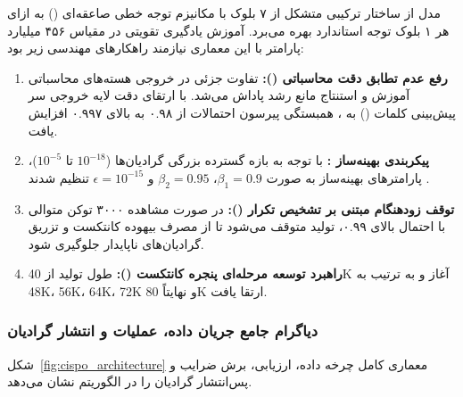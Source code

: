 مدل  از ساختار ترکیبی متشکل از ۷ بلوک  با مکانیزم توجه خطی صاعقه‌ای () \cite{qin2024lightning2} به ازای هر ۱ بلوک توجه استاندارد  بهره می‌برد. آموزش یادگیری تقویتی در مقیاس ۴۵۶ میلیارد پارامتر با این معماری نیازمند راهکارهای مهندسی زیر بود:
\begin{enumerate}
    \item \textbf{رفع عدم تطابق دقت محاسباتی ():} تفاوت جزئی در خروجی هسته‌های محاسباتی آموزش و استنتاج مانع رشد پاداش می‌شد. با ارتقای دقت لایه خروجی سر پیش‌بینی کلمات () به ، همبستگی پیرسون احتمالات از ۰.۹۸ به بالای ۰.۹۹۷ افزایش یافت.
    \item \textbf{پیکربندی بهینه‌ساز :} با توجه به بازه گسترده بزرگی گرادیان‌ها ($10^{-18}$ تا $10^{-5}$)، پارامترهای بهینه‌ساز به صورت $\beta_1 = 0.9$، $\beta_2 = 0.95$ و $\epsilon = 10^{-15}$ تنظیم شدند \cite{loshchilov2019adamw}.
    \item \textbf{توقف زودهنگام مبتنی بر تشخیص تکرار ():} در صورت مشاهده ۳۰۰۰ توکن متوالی با احتمال بالای ۰.۹۹، تولید متوقف می‌شود تا از مصرف بیهوده کانتکست و تزریق گرادیان‌های ناپایدار جلوگیری شود.
    \item \textbf{راهبرد توسعه مرحله‌ای پنجره کانتکست ():} طول تولید از 40K آغاز و به ترتیب به 48K، 56K، 64K، 72K و نهایتاً 80K ارتقا یافت.
\end{enumerate}

\subsubsection*{دیاگرام جامع جریان داده، عملیات و انتشار گرادیان}

شکل~\ref{fig:cispo_architecture} معماری کامل چرخه داده، ارزیابی، برش ضرایب و پس‌انتشار گرادیان را در الگوریتم  نشان می‌دهد.

